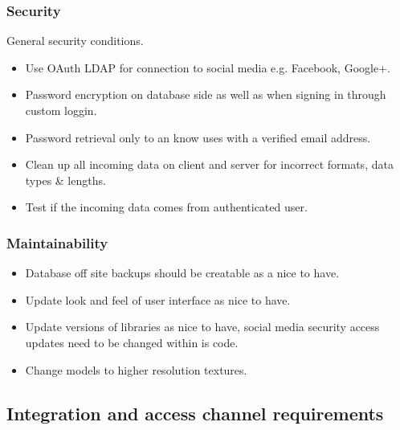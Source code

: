 \documentclass[letterpaper]{article}
\begin{document}
				\subsubsection*{Security}
				\vspace{0.1in}
				
					General security conditions.
					\begin{itemize}
						\item Use OAuth LDAP for connection to social media e.g. Facebook, Google+.
						\item Password encryption on database side as well as when signing in through custom loggin.
						\item Password retrieval only to an know uses with a verified email address.
						\item Clean up all incoming data on client and server for incorrect formats, data types \& lengths.
						\item Test if the incoming data comes from authenticated user.
					\end{itemize}
				
				\subsubsection*{Maintainability}
				\vspace{0.1in}
				
					\begin{itemize}
						\item Database off site backups should be creatable as a nice to have.
						\item Update look and feel of user interface as nice to have.
						\item Update versions of libraries as nice to have, social media security access updates need to be changed within is code.
						\item Change models to higher resolution textures.
					\end{itemize}
				
			\vspace{0.2in}
			\subsection*{ Integration and access channel requirements }
			\vspace{0.1in}
			
\end{document}
